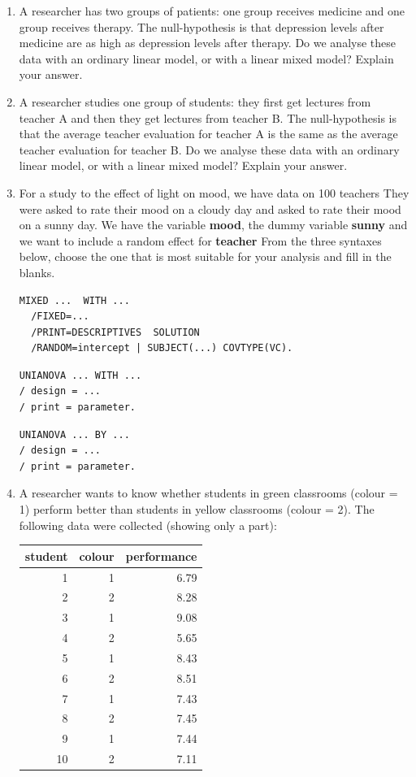 \documentclass[]{book}\usepackage[]{graphicx}\usepackage[]{color}
\newenvironment{knitrout}{}{} %
\begin{document}
\begin{enumerate}
\item A researcher has two groups of patients: one group receives medicine and one group receives therapy. The null-hypothesis is that depression levels after medicine are as high as depression levels after therapy. Do we analyse these data with an ordinary linear model, or with a linear mixed model? Explain your answer.

\item  A researcher studies one group of students: they first get lectures from teacher A and then they get lectures from teacher B. The null-hypothesis is that the average teacher evaluation for teacher A is the same as the average teacher evaluation for teacher B. Do we analyse these data with an ordinary linear model, or with a linear mixed model? Explain your answer. 


\item  For a study to the effect of light on mood, we have data on 100 teachers They were asked to rate their mood on a cloudy day and asked to rate their mood on a sunny day. We have the variable \textbf{mood}, the dummy variable \textbf{sunny} and we want to include a random effect for \textbf{teacher} From the three syntaxes below, choose the one that is most suitable for your analysis and fill in the blanks.


\begin{verbatim}
MIXED ...  WITH ...
  /FIXED=...
  /PRINT=DESCRIPTIVES  SOLUTION
  /RANDOM=intercept | SUBJECT(...) COVTYPE(VC).
\end{verbatim}


\begin{verbatim}
UNIANOVA ... WITH ... 
/ design = ...
/ print = parameter.
\end{verbatim}


\begin{verbatim}
UNIANOVA ... BY ... 
/ design = ...
/ print = parameter.
\end{verbatim}


\item  A researcher wants to know whether students in green classrooms (colour = 1) perform better than students in yellow classrooms (colour = 2). The following data were collected (showing only a part):

\begin{knitrout}
\color{fgcolor}
\begin{tabular}{r|r|r}
\hline
student & colour & performance\\
\hline
1 & 1 & 6.79\\
\hline
2 & 2 & 8.28\\
\hline
3 & 1 & 9.08\\
\hline
4 & 2 & 5.65\\
\hline
5 & 1 & 8.43\\
\hline
6 & 2 & 8.51\\
\hline
7 & 1 & 7.43\\
\hline
8 & 2 & 7.45\\
\hline
9 & 1 & 7.44\\
\hline
10 & 2 & 7.11\\
\hline
\end{tabular}



\end{knitrout}
\end{enumerate}
\end{document}
